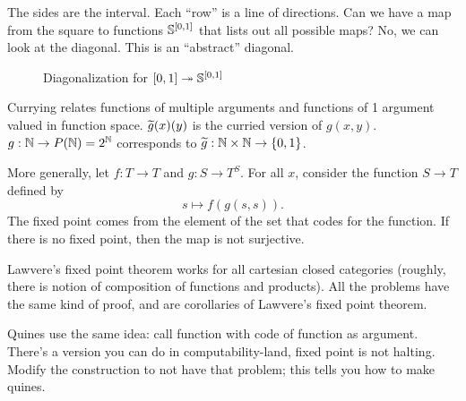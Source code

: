 \documentclass[11pt]{article}
\begin{document}
The sides are the interval. Each ``row''  is a line of directions. Can we have a map from the square to functions $\mathbb{S}^{[0,1]}$ that lists out all possible maps? No, we can look at the diagonal. This is an ``abstract'' diagonal.

\begin{figure}
\caption{Diagonalization for $[0,1]\twoheadrightarrow \mathbb{S}^{[0,1]}$}
\end{figure}



Currying relates functions of multiple arguments and functions of 1 argument valued in function space. $\widetilde{g}(x)(y)$ is the curried version of $g(x,y)$. $g:\mathbb{N} \to P(\mathbb{N})=2^{\mathbb{N}}$ corresponds to $\widetilde{g}:\mathbb{N}\times \mathbb{N} \to \{0,1\}$.

More generally, let $f:T\to T$ and $g:S\to T^S$. For all $x$, consider the function $S\to T$ defined by
$$
s\mapsto f(g(s,s)).
$$
The fixed point comes from the element of the set that codes for the function. If there is no fixed point, then the map is not surjective.

Lawvere's fixed point theorem works for all cartesian closed categories (roughly, there is notion of composition of functions and products).%
All the problems have the same kind of proof, and are corollaries of Lawvere's fixed point theorem.


Quines use the same idea: call function with code of function as argument. There's a version you can do in computability-land, fixed point is not halting. Modify the construction to not have that problem; this tells you how to make quines.

\end{document}

